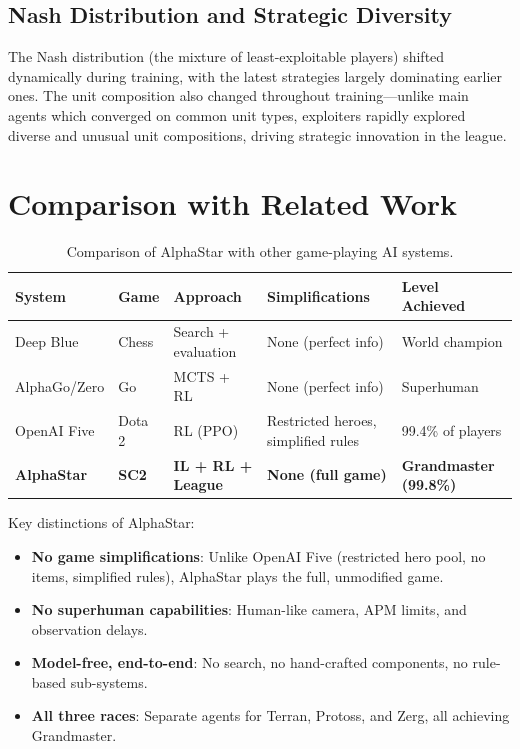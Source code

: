 \documentclass[11pt,a4paper]{article}
\begin{document}
\subsection{Nash Distribution and Strategic Diversity}

The Nash distribution (the mixture of least-exploitable players) shifted dynamically during training, with the latest strategies largely dominating earlier ones. The unit composition also changed throughout training---unlike main agents which converged on common unit types, exploiters rapidly explored diverse and unusual unit compositions, driving strategic innovation in the league.

\section{Comparison with Related Work}

\begin{table}[H]
\centering
\caption{Comparison of AlphaStar with other game-playing AI systems.}
\label{tab:comparison}
\begin{tabular}{@{}p{2.5cm}p{2cm}p{2.5cm}p{2.5cm}p{3cm}@{}}
\toprule
\textbf{System} & \textbf{Game} & \textbf{Approach} & \textbf{Simplifications} & \textbf{Level Achieved} \\
\midrule
Deep Blue & Chess & Search + evaluation & None (perfect info) & World champion \\
AlphaGo/Zero & Go & MCTS + RL & None (perfect info) & Superhuman \\
OpenAI Five & Dota 2 & RL (PPO) & Restricted heroes, simplified rules & 99.4\% of players \\
\textbf{AlphaStar} & \textbf{SC2} & \textbf{IL + RL + League} & \textbf{None (full game)} & \textbf{Grandmaster (99.8\%)} \\
\bottomrule
\end{tabular}
\end{table}

Key distinctions of AlphaStar:
\begin{itemize}[nosep]
    \item \textbf{No game simplifications}: Unlike OpenAI Five (restricted hero pool, no items, simplified rules), AlphaStar plays the full, unmodified game.
    \item \textbf{No superhuman capabilities}: Human-like camera, APM limits, and observation delays.
    \item \textbf{Model-free, end-to-end}: No search, no hand-crafted components, no rule-based sub-systems.
    \item \textbf{All three races}: Separate agents for Terran, Protoss, and Zerg, all achieving Grandmaster.
\end{itemize}
\end{document}
